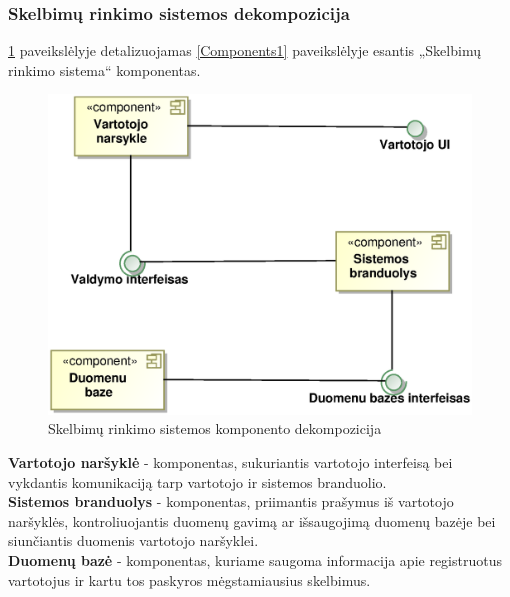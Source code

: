 \documentclass[12pt]{article}
\begin{document}
	\subsubsection{Skelbimų rinkimo sistemos dekompozicija}
\ref{Components2} paveikslėlyje detalizuojamas \ref{Components1} paveikslėlyje esantis „Skelbimų rinkimo sistema“ komponentas.
	\begin{figure}[h]
		\begin{center}
			\includegraphics[width=\textwidth]{Komponentai2.eps}
			\caption{Skelbimų rinkimo sistemos komponento dekompozicija\label{Components2}}
		\end{center}
	\end{figure}

	\textbf{Vartotojo naršyklė} - komponentas, sukuriantis vartotojo interfeisą bei vykdantis komunikaciją tarp vartotojo ir sistemos branduolio.\\

	
	\textbf{Sistemos branduolys} - komponentas, priimantis prašymus iš vartotojo naršyklės, kontroliuojantis duomenų gavimą ar išsaugojimą duomenų bazėje bei siunčiantis duomenis vartotojo naršyklei.\\

	
	\textbf{Duomenų bazė} - komponentas, kuriame saugoma informacija apie registruotus vartotojus ir kartu tos paskyros mėgstamiausius skelbimus.\\
	\pagebreak
\end{document}
